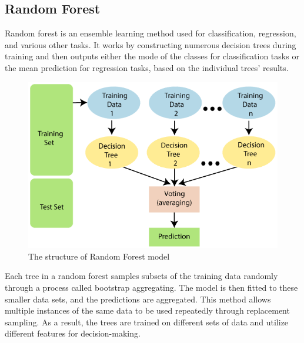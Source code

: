 \documentclass{ieeeojies}
\begin{document}
\subsection{Random Forest}
Random forest is an ensemble learning method used for classification, regression, and various other tasks. It works by constructing numerous decision trees during training and then outputs either the mode of the classes for classification tasks or the mean prediction for regression tasks, based on the individual trees' results.
\begin{figure}[H]
	\centering
	\begin{minipage}{0.23\textwidth}
		\centering
		\includegraphics[width=1\textwidth]{bibliography/Images/RandomForest_Img1.png}
		\caption{The structure of Random Forest model}
		\label{fig:1}
	\end{minipage}
\end{figure}
Each tree in a random forest samples subsets of the training data randomly through a process called bootstrap aggregating. The model is then fitted to these smaller data sets, and the predictions are aggregated. This method allows multiple instances of the same data to be used repeatedly through replacement sampling. As a result, the trees are trained on different sets of data and utilize different features for decision-making.
\end{document}

